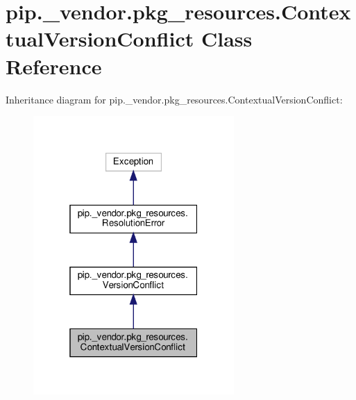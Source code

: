 \hypertarget{classpip_1_1__vendor_1_1pkg__resources_1_1ContextualVersionConflict}{}\section{pip.\+\_\+vendor.\+pkg\+\_\+resources.\+Contextual\+Version\+Conflict Class Reference}
\label{classpip_1_1__vendor_1_1pkg__resources_1_1ContextualVersionConflict}


Inheritance diagram for pip.\+\_\+vendor.\+pkg\+\_\+resources.\+Contextual\+Version\+Conflict\+:
\nopagebreak
\begin{figure}[H]
\begin{center}
\leavevmode
\includegraphics[width=217pt]{classpip_1_1__vendor_1_1pkg__resources_1_1ContextualVersionConflict__inherit__graph}
\end{center}
\end{figure}


